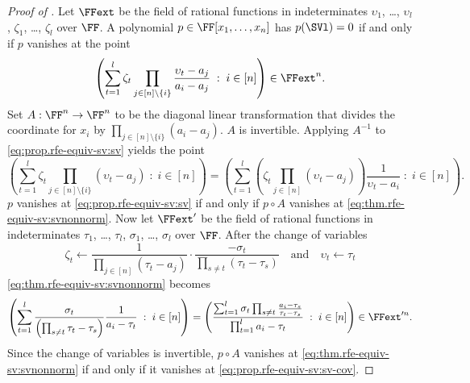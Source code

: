 \begin{proof}[Proof of ]
  Let \(\FFext\) be the field of rational functions in indeterminates
  \(\upsilon_1\), \ldots, \(\upsilon_l\), \(\zeta_1\), \ldots, \(\zeta_l\)
  over \(\FF\).
  A polynomial \(p\in\FF[x_1,\ldots,x_n]\) has \(p(\SVl)=0\)
  if and only if
  \(p\) vanishes at the point
  \begin{equation}
    \label{eq:prop.rfe-equiv-sv:sv}
    \left(
      \sum_{t=1}^l \zeta_t \prod_{j\in [n]\setminus\{i\}} \frac{\upsilon_t -
      a_{j}}{a_i - a_{j}}
      \;:\; i \in [n]
    \right) \in \FFext^n.
  \end{equation}
  Set \(A : \FF^n \to \FF^n\) to be the diagonal linear transformation
  that divides the coordinate for \(x_i\) by
  \(\prod_{j\in [n]\setminus\{i\}} (a_i - a_{j})\).
  $A$ is invertible.
  Applying \(A^{-1}\) to \eqref{eq:prop.rfe-equiv-sv:sv} yields the point
  \begin{equation}
    \label{eq:thm.rfe-equiv-sv:svnonnorm}
    \left(
      \sum_{t=1}^l
        \zeta_t
        \prod_{j\in [n]\setminus\{i\}}
          (\upsilon_t - a_{j})
      \;:\; i \in [n]
    \right)
    =
    \left(
      \sum_{t=1}^l
        \left(
          \zeta_t
          \prod_{j\in [n]} (\upsilon_t - a_{j})
        \right)
      \frac{1}{\upsilon_t - a_i}
      \;:\; i \in [n]
    \right).
  \end{equation}
  \(p\) vanishes at \eqref{eq:prop.rfe-equiv-sv:sv} if and only if
  \(p\circ A\) vanishes at \eqref{eq:thm.rfe-equiv-sv:svnonnorm}.
  Now let \(\FFext'\) be the field of rational functions in indeterminates
  \(\tau_1\), \ldots, \(\tau_l\), \(\sigma_1\), \ldots,
  \(\sigma_l\) over \(\FF\).
  After the change of variables
  \begin{equation*}
    \zeta_t \gets
      \frac{1}{\prod_{j\in [n]}(\tau_t-a_{j})}
      \cdot
      \frac{-\sigma_t}{\prod_{s \ne t}(\tau_t - \tau_{s})}
      \quad
      \text{and}
      \quad
    \upsilon_t \gets \tau_t
  \end{equation*}
  \eqref{eq:thm.rfe-equiv-sv:svnonnorm} becomes
  \begin{equation}
    \label{eq:prop.rfe-equiv-sv:sv-cov}
    \left(
      \sum_{t=1}^l
        \frac{\sigma_t}{\left(\prod_{s \ne t} \tau_t - \tau_{s}\right)}
        \frac{1}{a_i - \tau_t}
      \;:\; i \in [n]
    \right)
    =
    \left(
      \frac{
        \sum_{t=1}^l
          \sigma_t
          \prod_{s \ne t} \frac{a_i - \tau_{s}}%
                               {\tau_t - \tau_{s}}
      }{
        \prod_{t=1}^l a_i - \tau_t
      }
      \;:\; i \in [n]
    \right)
    \in \FFext'^n.
  \end{equation}
  Since the change of variables is invertible,
  \(p\circ A\) vanishes at \eqref{eq:thm.rfe-equiv-sv:svnonnorm}
  if and only if it vanishes at \eqref{eq:prop.rfe-equiv-sv:sv-cov}.


\end{proof}
